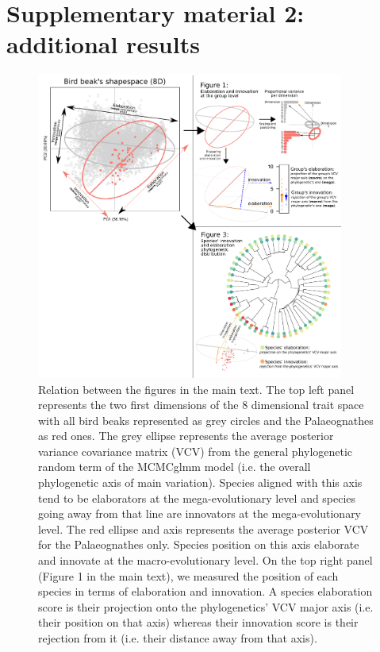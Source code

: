 \documentclass[12pt,letterpaper]{article}
\begin{document}
\section{Supplementary material 2: additional results}

\begin{figure}[!htbp]
\centering
   \includegraphics[width=0.9\textwidth]{Figures/cheat_sheet.pdf}
\caption{\scriptsize Relation between the figures in the main text.
The top left panel represents the two first dimensions of the 8 dimensional trait space with all bird beaks represented as grey circles and the Palaeognathes as red ones.
The grey ellipse represents the average posterior variance covariance matrix (VCV) from the general phylogenetic random term of the MCMCglmm model (i.e. the overall phylogenetic axis of main variation).
Species aligned with this axis tend to be elaborators at the mega-evolutionary level and species going away from that line are innovators at the mega-evolutionary level.
The red ellipse and axis represents the average posterior VCV for the Palaeognathes only.
Species position on this axis elaborate and innovate at the macro-evolutionary level.
On the top right panel (Figure 1 in the main text), we measured the position of each species in terms of elaboration and innovation.
A species elaboration score is their projection onto the phylogenetics' VCV major axis (i.e. their position on that axis) whereas their innovation score is their rejection from it (i.e. their distance away from that axis).
}
\end{figure}
\end{document}

